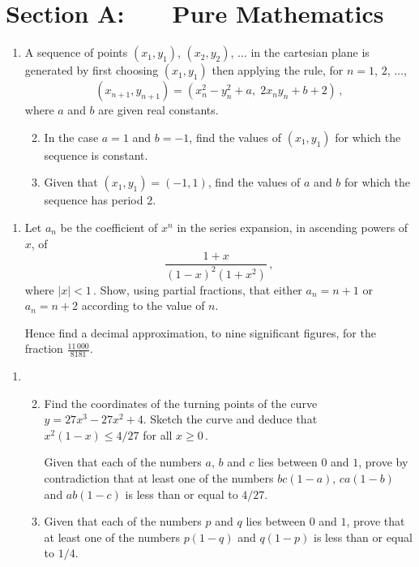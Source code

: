 \documentclass[a4, 11pt]{report}
\newlength{\qspace}
\newcounter{qnumber}
\newenvironment{question}%
 {\vspace{\qspace}
  \begin{enumerate}[\bfseries 1\quad][10]%
    \setcounter{enumi}{\value{qnumber}}%
    \item%
 }
{
  \end{enumerate}
  \filbreak
  \stepcounter{qnumber}
 }
\newenvironment{questionparts}[1][1]%
 {
  \begin{enumerate}[\bfseries (i)]%
    \setcounter{enumii}{#1}
    \addtocounter{enumii}{-1}
    \setlength{\itemsep}{5mm}
    \setlength{\parskip}{8pt}
 }
 {
  \end{enumerate}
 }
\def\le{\leqslant}
\def\ge{\geqslant}
\begin{document}
\setcounter{page}{2}

 
\section*{Section A: \ \ \ Pure Mathematics}

\begin{question}
A sequence of points $(x_1,y_1)$, $(x_2,y_2)$, $\ldots$ in the
cartesian plane is generated by first choosing $(x_1,y_1)$ then
applying the rule, for $n=1$, $2$, $\ldots$,
\[
(x_{n+1}, y_{n+1}) = (x_n^2-y_n^2 +a, \; 2x_ny_n+b+2)\,,
\]
where $a$ and $b$ are given real constants.

\begin{questionparts}
\item  In the case $a=1$ and  $b=-1$, find the values
of $(x_1,y_1)$ for which the sequence is constant.
\item  Given that $(x_1,y_1) = (-1,1)$, find the  values
of $a$ and $b$ for which the sequence has  period
2.
\end{questionparts}
\end{question}

\begin{question}
Let $a_n$ be the coefficient of $x^n$ in the series expansion, 
in ascending powers of $x$, of
\[\displaystyle
\frac{1+x}{(1-x)^2(1+x^2)}
\,,
\]
where $\vert x \vert <1\,$.
Show, using partial fractions,
 that either $a_n =n+1$ or $a_n = n+2$ according to the value of $n$.

Hence find a decimal approximation, to nine significant figures, 
for the fraction $ \displaystyle \frac{11\,000}{8181}$.



\end{question}

\begin{question}
\begin{questionparts}
\item  
Find the coordinates of the turning points of the curve
$y=27x^3-27x^2+4$. Sketch the curve  and deduce that
$x^2(1-x)\le 4/27$ for all $x\ge0\,$.

Given that each of the  numbers $a$, $b$ and $c$ lies between 
$0$ and $1$, prove by contradiction that at least one of the 
numbers $bc(1-a)$, $ca(1-b)$ and $ab(1-c)$ is less than
or equal to $4/27$.

\item  Given that each of the  numbers $p$ and $q$ lies between 
$0$ and $1$,
prove that at least one of the numbers
 $p(1-q)$ and $q(1-p)$ is less than or equal to $1/4$. 

\end{questionparts}
\end{question}
\end{document}
